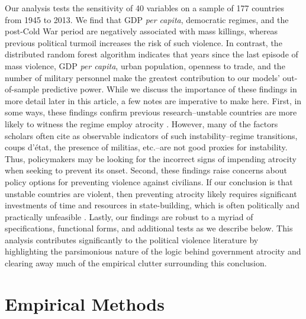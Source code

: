 Our analysis tests the sensitivity of 40 variables on a sample of 177 countries from 1945 to 2013. We find that GDP \textit{per capita}, democratic regimes, and the post-Cold War period are negatively associated with mass killings, whereas previous political turmoil increases the risk of such violence. In contrast, the distributed random forest algorithm indicates that years since the last episode of mass violence, GDP \textit{per capita}, urban population, openness to trade, and the number of military personnel make the greatest contribution to our models’ out-of-sample predictive power. While we discuss the importance of these findings in more detail later in this article, a few notes are imperative to make here. First, in some ways, these findings confirm previous research–unstable countries are more likely to witness the regime employ atrocity \citep[e.g.,]{goldsmith2013forecasting,harff2003no,krain1997state}.  However, many of the factors scholars often cite as observable indicators of such instability--regime transitions, coups d'état, the presence of militias, etc.--are not good proxies for instability. Thus, policymakers may be looking for the incorrect signs of impending atrocity when seeking to prevent its onset. Second, these findings raise concerns about policy options for preventing violence against civilians. If our conclusion is that unstable countries are violent, then preventing atrocity likely requires significant investments of time and resources in state-building, which is often politically and practically unfeasible \citep{doyle2006making}. Lastly, our findings are robust to a myriad of specifications, functional forms, and additional tests as we describe below. This analysis contributes significantly to the political violence literature by highlighting the parsimonious nature of the logic behind government atrocity and clearing away much of the empirical clutter surrounding this conclusion. 

\section{Empirical Methods}
\label{sec:methods4}

